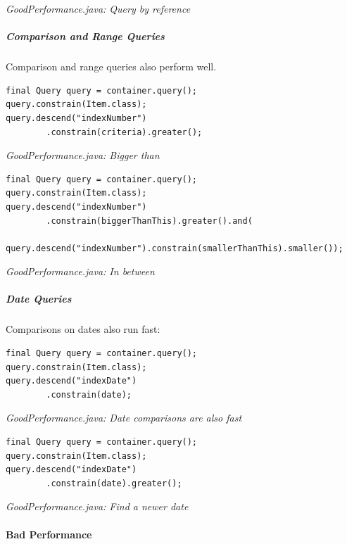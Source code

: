 {\small\itshape GoodPerformance.java: Query by reference\par}
\medskip

\subparagraph*{Comparison and Range Queries}

Comparison and range queries also perform well.

\begin{lstlisting}
final Query query = container.query();
query.constrain(Item.class);
query.descend("indexNumber")
        .constrain(criteria).greater();
\end{lstlisting}

{\small\itshape GoodPerformance.java: Bigger than\par}
\medskip

\begin{lstlisting}
final Query query = container.query();
query.constrain(Item.class);
query.descend("indexNumber")
        .constrain(biggerThanThis).greater().and(
        query.descend("indexNumber").constrain(smallerThanThis).smaller());
\end{lstlisting}

{\small\itshape GoodPerformance.java: In between\par}
\medskip

\subparagraph*{Date Queries}

Comparisons on dates also run fast:

\begin{lstlisting}
final Query query = container.query();
query.constrain(Item.class);
query.descend("indexDate")
        .constrain(date);
\end{lstlisting}

{\small\itshape GoodPerformance.java: Date comparisons are also fast\par}
\medskip

\begin{lstlisting}
final Query query = container.query();
query.constrain(Item.class);
query.descend("indexDate")
        .constrain(date).greater();
\end{lstlisting}

{\small\itshape GoodPerformance.java: Find a newer date\par}
\medskip

\paragraph{Bad Performance}
\label{ref:basics-querying-soda-soda-performance-characteristics:badperf}

